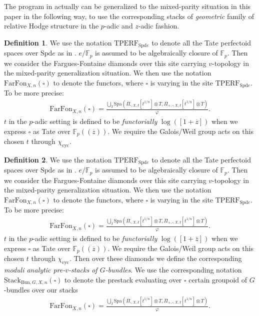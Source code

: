 \documentclass[12pt]{article}
\theoremstyle{definition}
\newtheorem{definition}{Definition}
\begin{document}
\indent The program in \cite{FS} actually can be generalized to the mixed-parity situation in this paper in the following way, to use the corresponding stacks of \textit{geometric} family of relative Hodge structure in the $p$-adic and $z$-adic fashion.


\begin{definition}
We use the notation $\mathrm{TPERF}_{\mathrm{Spd}e}$ to denote all the Tate perfectoid spaces over $\mathrm{Spd}e$ as in \cite{FS}. $e/\mathbb{F}_p$ is assumed to be algebraically closure of $\mathbb{F}_p$. Then we consider the Fargues-Fontaine diamonds over this site carrying $v$-topology in the mixed-parity generalization situation. We then use the notation $\mathrm{FarFon}_{X,n}(\square)$ to denote the functors, where $\square$ is varying in the site $\mathrm{TPERF}_{\mathrm{Spd}e}$. To be more precise:
\begin{align}
\mathrm{FarFon}_{X,n}(\square) = \frac{\bigcup_{I} \mathrm{Spa}(\overline{\Pi}_{\square,X,I}[t^{1/n}]\otimes T, \overline{\Pi}_{+,\square,X,I}[t^{1/n}]\otimes T)}{\varphi}.
\end{align}
$t$ in the $p$-adic setting is defined to be \textit{functorially} $\log([1+\overline{z}])$ when we express $\square$ as Tate over $\mathbb{F}_p((\overline{z}))$. We require the Galois/Weil group acts on this chosen $t$ through $\chi_\mathrm{cyc}$.
\end{definition}


\begin{definition}
We use the notation $\mathrm{TPERF}_{\mathrm{Spd}e}$ to denote all the Tate perfectoid spaces over $\mathrm{Spd}e$ as in \cite{FS}. $e/\mathbb{F}_p$ is assumed to be algebraically closure of $\mathbb{F}_p$. Then we consider the Fargues-Fontaine diamonds over this site carrying $v$-topology in the mixed-parity generalization situation. We then use the notation $\mathrm{FarFon}_{X,n}(\square)$ to denote the functors, where $\square$ is varying in the site $\mathrm{TPERF}_{\mathrm{Spd}e}$. To be more precise:
\begin{align}
\mathrm{FarFon}_{X,n}(\square) = \frac{\bigcup_{I} \mathrm{Spa}(\overline{\Pi}_{\square,X,I}[t^{1/n}]\otimes T, \overline{\Pi}_{+,\square,X,I}[t^{1/n}]\otimes T)}{\varphi}.
\end{align}
$t$ in the $p$-adic setting is defined to be \textit{functorially} $\log([1+\overline{z}])$ when we express $\square$ as Tate over $\mathbb{F}_p((\overline{z}))$. We require the Galois/Weil group acts on this chosen $t$ through $\chi_\mathrm{cyc}$. Then over these diamonds we define the corresponding \textit{moduli analytic pre-$v$-stacks of $G$-bundles}. We use the corresponding notation $\mathrm{Stack}_{\mathrm{Bun},G,X,n}(\square)$ to denote the prestack evaluating over $\square$ certain groupoid of $G$-bundles over our stacks 
\begin{align}
\mathrm{FarFon}_{X,n}(\square) = \frac{\bigcup_{I} \mathrm{Spa}(\overline{\Pi}_{\square,X,I}[t^{1/n}]\otimes T, \overline{\Pi}_{+,\square,X,I}[t^{1/n}]\otimes T)}{\varphi}.
\end{align} 
\end{definition}
\end{document}
